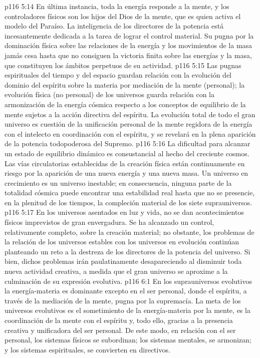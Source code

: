 \vs p116 5:14 \pc En última instancia, toda la energía responde a la mente, y los controladores físicos son los hijos del Dios de la mente, que es quien activa el modelo del Paraíso. La inteligencia de los directores de la potencia está incesantemente dedicada a la tarea de lograr el control material. Su pugna por la dominación física sobre las relaciones de la energía y los movimientos de la masa jamás cesa hasta que no consiguen la victoria finita sobre las energías y la masa, que constituyen los ámbitos perpetuos de su actividad.
\vs p116 5:15 Las pugnas espirituales del tiempo y del espacio guardan relación con la evolución del dominio del espíritu sobre la materia por mediación de la mente (personal); la evolución física (no personal) de los universos guarda relación con la armonización de la energía cósmica respecto a los conceptos de equilibrio de la mente sujetos a la acción directiva del espíritu. La evolución total de todo el gran universo es cuestión de la unificación personal de la mente regidora de la energía con el intelecto en coordinación con el espíritu, y se revelará en la plena aparición de la potencia todopoderosa del Supremo.
\vs p116 5:16 La dificultad para alcanzar un estado de equilibrio dinámico es consustancial al hecho del creciente cosmos. Las vías circulatorias establecidas de la creación física están continuamente en riesgo por la aparición de una nueva energía y una nueva masa. Un universo en crecimiento es un universo inestable; en consecuencia, ninguna parte de la totalidad cósmica puede encontrar una estabilidad real hasta que no se presencie, en la plenitud de los tiempos, la compleción material de los siete suprauniversos.
\vs p116 5:17 En los universos asentados en luz y vida, no se dan acontecimientos físicos imprevistos de gran envergadura. Se ha alcanzado un control, relativamente completo, sobre la creación material; no obstante, los problemas de la relación de los universos estables con los universos en evolución continúan planteando un reto a la destreza de los directores de la potencia del universo. Si bien, dichos problemas irán paulatinamente desapareciendo al disminuir toda nueva actividad creativa, a medida que el gran universo se aproxime a la culminación de su expresión evolutiva.
\vs p116 6:1 En los suprauniversos evolutivos la energía\hyp{}materia es dominante excepto en el ser personal, donde el espíritu, a través de la mediación de la mente, pugna por la supremacía. La meta de los universos evolutivos es el sometimiento de la energía\hyp{}materia por la mente, es la coordinación de la mente con el espíritu y, todo ello, gracias a la presencia creativa y unificadora del ser personal. De este modo, en relación con el ser personal, los sistemas físicos se subordinan; los sistemas mentales, se armonizan; y los sistemas espirituales, se convierten en directivos.
